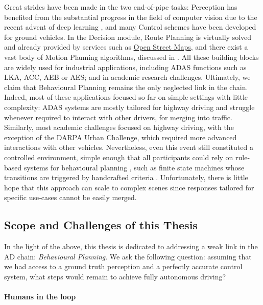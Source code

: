 Great strides have been made in the two end-of-pipe tasks: Perception has benefited from the substantial progress in the field of computer vision due to the recent advent of deep learning \citep[surveyed in][]{janai2017computer}, and many Control schemes \citep[surveyed in][]{Polack2018} have been developed for ground vehicles. In the Decision module, Route Planning is virtually solved and already provided by services such as \href{https://wiki.openstreetmap.org/wiki/Routing}{Open Street Maps}, and there exist a vast body of Motion Planning algorithms, discussed in . All these building blocks are widely used for industrial applications, including \gls{ADAS} functions such as \gls{LKA}, \gls{ACC}, \gls{AEB} or \gls{AES}; and in academic research challenges. Ultimately, we claim that Behavioural Planning remains the only neglected link in the chain. Indeed, most of these applications focused so far on simple settings with little complexity: \gls{ADAS} systems are mostly tailored for highway driving and struggle whenever required to interact with other drivers, \eg for merging into traffic. %
Similarly, most academic challenges focused on highway driving, with the exception of the DARPA Urban Challenge, which required more advanced interactions with other vehicles. Nevertheless, even this event still constituted a controlled environment, simple enough that all participants could rely on rule-based systems for behavioural planning \citep{Buehler2009}, such as finite state machines whose transitions are triggered by handcrafted criteria \citep[\eg][]{Baker2008}. Unfortunately, there is little hope that this approach can scale to complex scenes since responses tailored for specific use-cases cannot be easily merged. %

\subsection{Scope and Challenges of this Thesis}
\label{sec:scopes-and-challenges}

In the light of the above, this thesis is dedicated to addressing a weak link in the \gls{AD} chain: \emph{Behavioural Planning}.  We ask the following question: assuming that we had access to a ground truth perception and a perfectly accurate control system, what steps would remain to achieve fully autonomous driving?


\paragraph{Humans in the loop}

